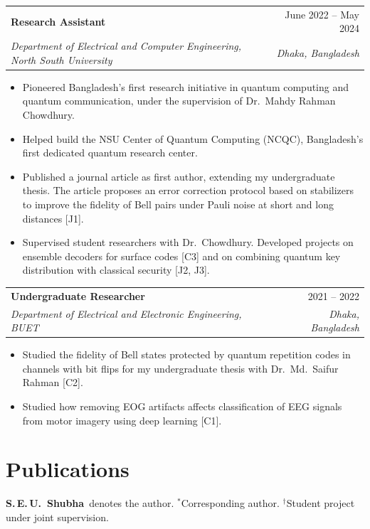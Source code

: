 \documentclass[letterpaper,11pt]{article}
\makeatletter
\newcommand{\me}{\textbf{S.\,E.\,U.~Shubha}}
\newcommand{\cventry}[4]{%
  \begin{tabularx}{\textwidth}{@{}X r@{}}
    \textbf{#1} & #2 \\
    \textit{#3} & \textit{#4}
  \end{tabularx}\par\vspace{1pt}}
\newenvironment{cvblock}
  {\par\noindent\begin{minipage}[t]{\textwidth}\raggedright}
  {\end{minipage}\par\vspace{5pt}}
\makeatother
\begin{document}
\begin{cvblock}
\cventry{Research Assistant}{June 2022 -- May 2024}
        {Department of Electrical and Computer Engineering, North South University}{Dhaka, Bangladesh}
\begin{itemize}
  \item Pioneered Bangladesh's first research initiative in quantum computing and quantum communication, under the supervision of Dr.~Mahdy Rahman Chowdhury.
  \item Helped build the NSU Center of Quantum Computing (NCQC), Bangladesh's first dedicated quantum research center.
  \item Published a journal article as first author, extending my undergraduate thesis. The article proposes an error correction protocol based on stabilizers to improve the fidelity of Bell pairs under Pauli noise at short and long distances [J1].
  \item Supervised student researchers with Dr.~Chowdhury. Developed projects on ensemble decoders for surface codes [C3] and on combining quantum key distribution with classical security [J2, J3].
\end{itemize}
\end{cvblock}

\begin{cvblock}
\cventry{Undergraduate Researcher}{2021 -- 2022}
        {Department of Electrical and Electronic Engineering, BUET}{Dhaka, Bangladesh}
\begin{itemize}
  \item Studied the fidelity of Bell states protected by quantum repetition codes in channels with bit flips for my undergraduate thesis with Dr.~Md.~Saifur Rahman [C2].
  \item Studied how removing EOG artifacts affects classification of EEG signals from motor imagery using deep learning [C1].
\end{itemize}
\end{cvblock}

\section{Publications}
{\small \me\ denotes the author. $^{*}$Corresponding author. $^{\dagger}$Student project under joint supervision.}
\end{document}
